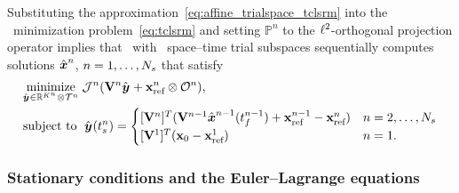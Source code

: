 Substituting the approximation~\eqref{eq:affine_trialspace_tclsrm} into the
\methodAcronym\ minimization problem~\eqref{eq:tclsrm} and setting 
$\mathbb{P}^n$ to the 
$\ell^2$-orthogonal projection operator 
implies that 
\methodAcronym\ with \spatialAcronym\ space--time trial subspaces
sequentially computes solutions
$\hat{ \boldsymbol x}^{n}$, $n = 1,\ldots,N_s$ that satisfy
\begin{equation}\label{eq:obj_gen_slab}
\begin{split}
	& \underset{\genstateyArgnt{} \in \RR{\romdimArg{n}} \otimes \timeSpaceArg{n}
			}{\text{minimize}}\; \mathcal{J}^n(\basismatArg{n} \genstateyArgnt{} +
			\stateInterceptArg{n} \otimes \onesFunction^n), \\ 
      & \text{subject to }\; \genstateyArg{}{\timeStartArg{n}} =
	\begin{cases}
\spatialIC & n = 2,\ldots,\nslabs \\
\genstateICOne & n=1. \end{cases} 
\end{split}
\end{equation}

\subsubsection{Stationary conditions and the Euler--Lagrange equations}

